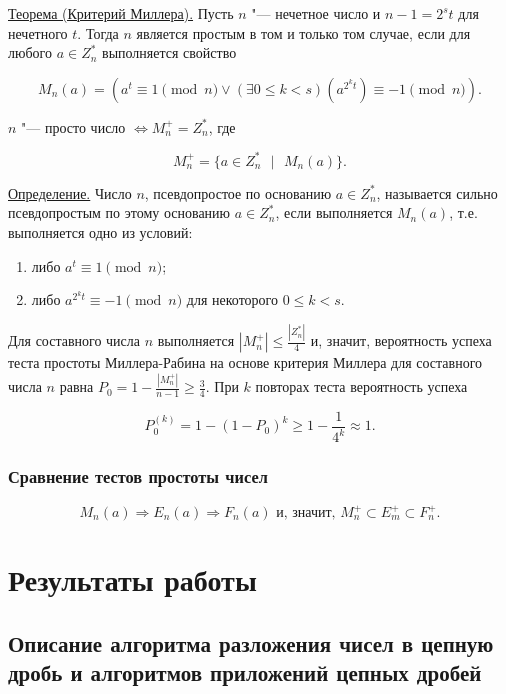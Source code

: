 \documentclass[bachelor, och, labwork]{shiza}
\begin{document}
            \underline{Теорема (Критерий Миллера).} Пусть $n$ "--- нечетное
            число и $n - 1 = 2^s t$ для нечетного $t$. Тогда $n$ является
            простым в том и только том случае, если для любого $a \in Z^*_n$
            выполняется свойство

            $$M_n (a) = \left(a^t \equiv 1 \pmod n \vee (\exists 0 \leq k < s) (a^{2^k t}) \equiv -1 \pmod n \right).$$

            $n$ "--- просто число $\Longleftrightarrow M^+_n = Z^*_n$, где

            $$M^+_n = \{a \in Z^*_n \text{ } | \text{ } M_n (a)\}.$$

            \underline{Определение.} Число $n$, псевдопростое по основанию $a
            \in Z^*_n$, называется сильно псевдопростым по этому основанию $a
            \in Z^*_n$, если выполняется $M_n (a)$, т.е. выполняется одно из
            условий:

            \begin{enumerate}
                \item либо $a^t \equiv 1 \pmod n$;
                \item либо $a^{2^k t} \equiv -1 \pmod n$ для некоторого $0 \leq
                k < s$.
            \end{enumerate}

            Для составного числа $n$ выполняется $|M^+_n| \leq
            \frac{|Z^*_n|}{4}$ и, значит, вероятность успеха теста простоты
            Миллера-Рабина на основе критерия Миллера для составного числа $n$
            равна $P_0 = 1 - \frac{|M^+_n|}{n - 1} \geq \frac{3}{4}.$ При $k$
            повторах теста вероятность успеха 

            $$P_0^{(k)} = 1 - (1 - P_0)^k \geq 1 - \frac{1}{4^k} \approx 1.$$


        \subsubsection{Сравнение тестов простоты чисел}

            $$M_n (a) \Longrightarrow E_n (a) \Longrightarrow F_n (a) \text{ и,
            значит, } M^+_n \subset E^+_m \subset F^+_n.$$

\section{Результаты работы}

    \subsection{Описание алгоритма разложения чисел в цепную дробь и алгоритмов
    приложений цепных дробей}
\end{document}
